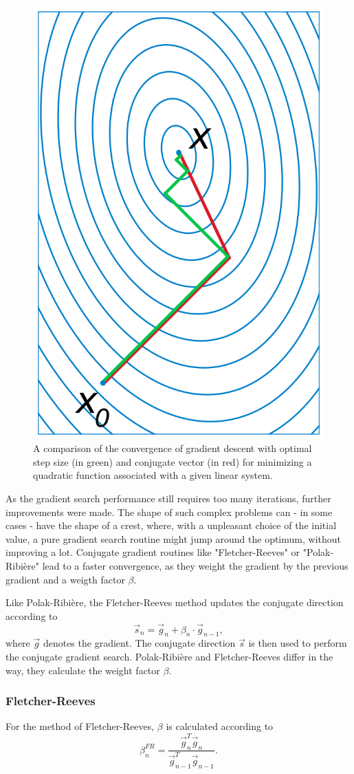 \begin{figure}[h]
\centering
\includegraphics[width=0.3\linewidth]{images/conjugate_gradient_example.png}
\caption{A comparison of the convergence of gradient descent with optimal step size (in green) and conjugate vector (in red) for minimizing a quadratic function associated with a given linear system\cite{wiki:conj_grad}.}
\label{fig:conj_grad_ex}
\end{figure}
As the gradient search performance still requires too many iterations, further improvements were made.
The shape of such complex problems can - in some cases - have the shape of a crest, where, with a unpleasant choice of the initial value, a pure gradient search routine might jump around the optimum, without improving a lot.
Conjugate gradient routines like "Fletcher-Reeves" or "Polak-Ribi\`{e}re" lead to a faster convergence, as they weight the gradient by the previous gradient and a weigth factor $\beta$. 

Like Polak-Ribi\`{e}re, the Fletcher-Reeves method updates the conjugate direction according to 
\begin{equation}
\vec{s}_n = \vec{g}_n + \beta_n\cdot\vec{g}_{n-1},
\label{eq:conj_update}
\end{equation}
where $\vec{g}$ denotes the gradient.
The conjugate direction $\vec{s}$ is then used to perform the conjugate gradient search.
Polak-Ribi\`{e}re and Fletcher-Reeves differ in the way, they calculate the weight factor $\beta$.

\subsubsection{Fletcher-Reeves}
For the method of Fletcher-Reeves, $\beta$ is calculated according to~\cite{Fletcher64}
\begin{equation}
\beta_n^{FR} = \frac{\vec{g}_n^T \vec{g}_n}{\vec{g}_{n-1}^T \vec{g}_{n-1}}.
\label{eq:beta_fr}
\end{equation}

